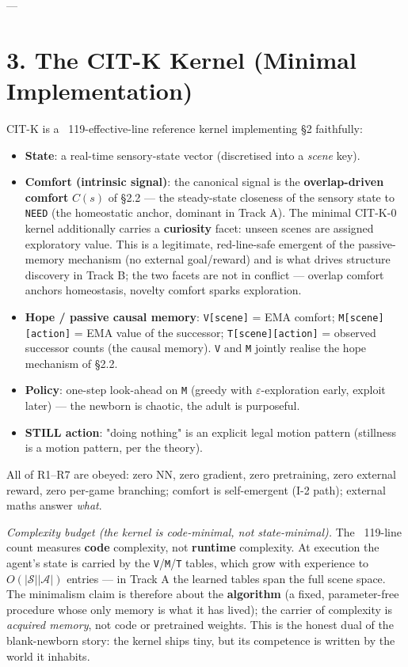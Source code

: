 \documentclass[11pt]{article}
\begin{document}
---

\section{3. The CIT-K Kernel (Minimal Implementation)}

CIT-K is a ~119-effective-line reference kernel implementing §2 faithfully:
\begin{itemize}
\item \textbf{State}: a real-time sensory-state vector (discretised into a \emph{scene} key).
\item \textbf{Comfort (intrinsic signal)}: the canonical signal is the \textbf{overlap-driven comfort} $C(s)$ of §2.2 — the steady-state closeness of the sensory state to \texttt{NEED} (the homeostatic anchor, dominant in Track A). The minimal CIT-K-0 kernel additionally carries a \textbf{curiosity} facet: unseen scenes are assigned exploratory value. This is a legitimate, red-line-safe emergent of the passive-memory mechanism (no external goal/reward) and is what drives structure discovery in Track B; the two facets are not in conflict — overlap comfort anchors homeostasis, novelty comfort sparks exploration.
\item \textbf{Hope / passive causal memory}: \texttt{V[scene]} = EMA comfort; \texttt{M[scene][action]} = EMA value of the successor; \texttt{T[scene][action]} = observed successor counts (the causal memory). \texttt{V} and \texttt{M} jointly realise the hope mechanism of §2.2.
\item \textbf{Policy}: one-step look-ahead on \texttt{M} (greedy with $\varepsilon$-exploration early, exploit later) — the newborn is chaotic, the adult is purposeful.
\item \textbf{STILL action}: "doing nothing" is an explicit legal motion pattern (stillness is a motion pattern, per the theory).
\end{itemize}

All of R1–R7 are obeyed: zero NN, zero gradient, zero pretraining, zero external reward, zero per-game branching; comfort is self-emergent (I-2 path); external maths answer \emph{what}.

\emph{Complexity budget (the kernel is code-minimal, not state-minimal).} The ~119-line count measures \textbf{code} complexity, not \textbf{runtime} complexity. At execution the agent's state is carried by the \texttt{V}/\texttt{M}/\texttt{T} tables, which grow with experience to $O(|\mathcal S||\mathcal A|)$ entries — in Track A the learned tables span the full scene space. The minimalism claim is therefore about the \textbf{algorithm} (a fixed, parameter-free procedure whose only memory is what it has lived); the carrier of complexity is \emph{acquired memory}, not code or pretrained weights. This is the honest dual of the blank-newborn story: the kernel ships tiny, but its competence is written by the world it inhabits.
\end{document}
